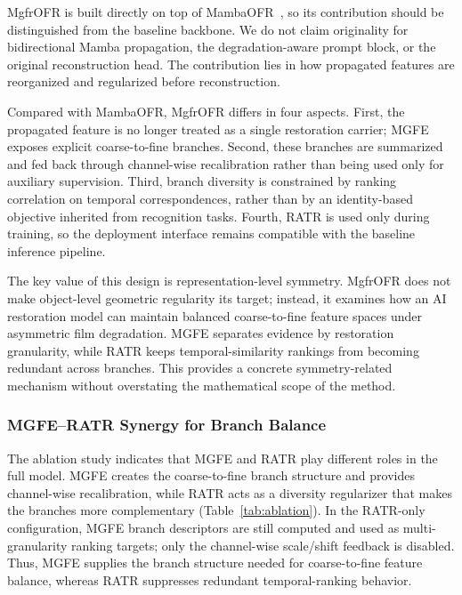 MgfrOFR is built directly on top of MambaOFR~\cite{mao2025mambaofr}, so its contribution should be distinguished from the baseline backbone. We do not claim originality for bidirectional Mamba propagation, the degradation-aware prompt block, or the original reconstruction head. The contribution lies in how propagated features are reorganized and regularized before reconstruction.

Compared with MambaOFR, MgfrOFR differs in four aspects. First, the propagated feature is no longer treated as a single restoration carrier; MGFE exposes explicit coarse-to-fine branches. Second, these branches are summarized and fed back through channel-wise recalibration rather than being used only for auxiliary supervision. Third, branch diversity is constrained by ranking correlation on temporal correspondences, rather than by an identity-based objective inherited from recognition tasks. Fourth, RATR is used only during training, so the deployment interface remains compatible with the baseline inference pipeline.

The key value of this design is representation-level symmetry. MgfrOFR does not make object-level geometric regularity its target; instead, it examines how an AI restoration model can maintain balanced coarse-to-fine feature spaces under asymmetric film degradation. MGFE separates evidence by restoration granularity, while RATR keeps temporal-similarity rankings from becoming redundant across branches. This provides a concrete symmetry-related mechanism without overstating the mathematical scope of the method.

\subsubsection{MGFE--RATR Synergy for Branch Balance}
\label{subsec:synergy}

The ablation study indicates that MGFE and RATR play different roles in the full model. MGFE creates the coarse-to-fine branch structure and provides channel-wise recalibration, while RATR acts as a diversity regularizer that makes the branches more complementary (Table~\ref{tab:ablation}). In the RATR-only configuration, MGFE branch descriptors are still computed and used as multi-granularity ranking targets; only the channel-wise scale/shift feedback is disabled. Thus, MGFE supplies the branch structure needed for coarse-to-fine feature balance, whereas RATR suppresses redundant temporal-ranking behavior.


